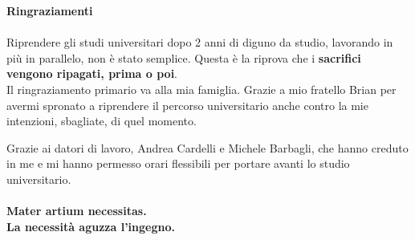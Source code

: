 \textbf{Ringraziamenti}
\paragraph{}
Riprendere gli studi universitari dopo 2 anni di diguno da studio, lavorando in più in parallelo, non è stato semplice.
Questa è la riprova che i \textbf{sacrifici vengono ripagati, prima o poi}.\\

Il ringraziamento primario va alla mia famiglia.
Grazie a mio fratello Brian per avermi spronato a riprendere il
percorso universitario anche contro la mie intenzioni,
sbagliate, di quel momento.

Grazie ai datori di lavoro, Andrea Cardelli e Michele Barbagli, 
che hanno creduto in me e mi hanno permesso orari flessibili
per portare avanti lo studio universitario.
\paragraph{}
\paragraph{}

\begin{center}
    \textbf{Mater artium necessitas.}\\
    \textbf{La necessità aguzza l'ingegno.}
\end{center}